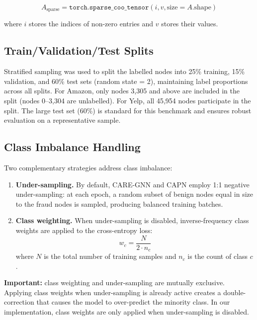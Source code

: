 \begin{equation}
A_{\text{sparse}} = \texttt{torch.sparse\_coo\_tensor}(i, v, \text{size} = A.\text{shape})
\end{equation}

where \( i \) stores the indices of non-zero entries and \( v \) stores their values.

\subsection{Train/Validation/Test Splits}
Stratified sampling was used to split the labelled nodes into 25\% training, 15\% validation, and 60\% test sets (random state = 2), maintaining label proportions across all splits. For Amazon, only nodes 3,305 and above are included in the split (nodes 0--3,304 are unlabelled). For Yelp, all 45,954 nodes participate in the split. The large test set (60\%) is standard for this benchmark and ensures robust evaluation on a representative sample.

\subsection{Class Imbalance Handling}
Two complementary strategies address class imbalance:

\begin{enumerate}
    \item \textbf{Under-sampling.} By default, CARE-GNN and CAPN employ 1:1 negative under-sampling: at each epoch, a random subset of benign nodes equal in size to the fraud nodes is sampled, producing balanced training batches.

    \item \textbf{Class weighting.} When under-sampling is disabled, inverse-frequency class weights are applied to the cross-entropy loss:
    \begin{equation}
    w_c = \frac{N}{2 \cdot n_c}
    \end{equation}
    where \( N \) is the total number of training samples and \( n_c \) is the count of class \( c \).
\end{enumerate}

\noindent
\textbf{Important:} class weighting and under-sampling are mutually exclusive. Applying class weights when under-sampling is already active creates a double-correction that causes the model to over-predict the minority class. In our implementation, class weights are only applied when under-sampling is disabled.

